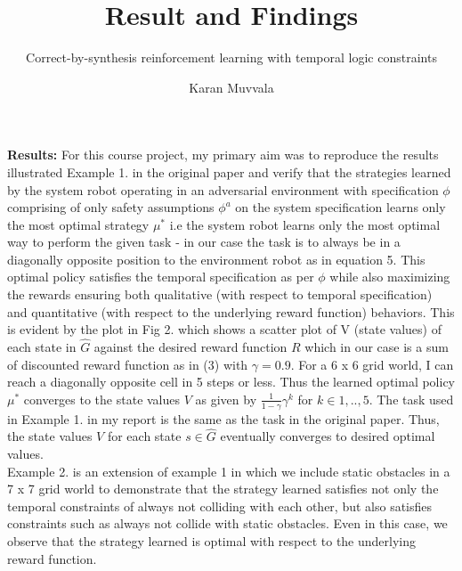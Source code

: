 \documentclass[11pt]{article}
\title{Result and Findings}
\subtitle{Correct-by-synthesis reinforcement learning with temporal logic constraints}
\author{\vspace{-10ex}Karan Muvvala }
\date{\vspace{-5ex}}
\begin{document}
    \maketitle
        
    \textbf{Results: } For this course project, my primary aim was to reproduce the results illustrated Example 1. in the original paper and verify that the strategies learned by the system robot operating in an adversarial environment with specification $\phi$ comprising of only safety assumptions $\phi^a$ on the system specification learns only the most optimal strategy $\mu^*$ i.e the system robot learns only the most optimal way to perform the given task - in our case the task is to always be in a diagonally opposite position to the environment robot as in equation 5. This optimal policy satisfies the temporal specification as per $\phi$ while also maximizing the rewards ensuring both qualitative (with respect to temporal specification) and quantitative (with respect to the underlying reward function) behaviors. This is evident by the plot in Fig 2. which shows a scatter plot of V (state values) of each state in $\hat{G}$ against the desired reward function $R$ which in our case is a sum of discounted reward function as in (3) with $\gamma = 0.9$. For a 6 x 6 grid world, I can reach a diagonally opposite cell in 5 steps or less. Thus the learned optimal policy $\mu^*$ converges to the state values $V$ as given by $\frac{1}{1-\gamma}\gamma^k$ for $k \in {1,..,5}$. The task used in Example 1. in my report is the same as the task in the original paper. Thus, the state values $V$ for each state $s \in \hat{G}$  eventually converges to desired optimal values.\\
        
        Example 2. is an extension of example 1 in which we include static obstacles in a 7 x 7 grid world to demonstrate that the strategy learned satisfies not only the temporal constraints  of always not colliding with each other, but also satisfies constraints such as always not collide with static obstacles. Even in this case, we observe that the strategy learned is optimal with respect to the underlying reward function.\\
        
\end{document}
